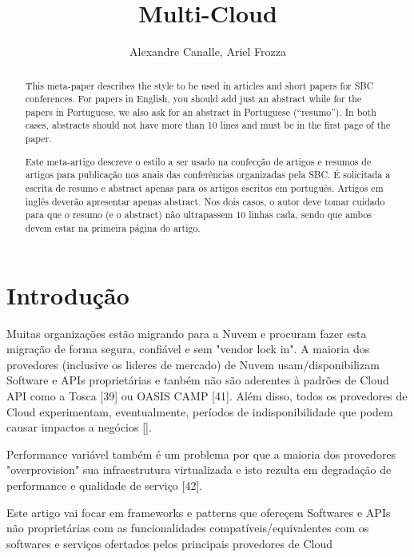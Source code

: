 \documentclass[12pt]{article}
\title{Multi-Cloud}
\author{Alexandre Canalle\inst{1}, Ariel Frozza\inst{1}}
\begin{document}

\singlespacing

\maketitle
	
\begin{abstract}
	This meta-paper describes the style to be used in articles and short papers
	for SBC conferences. For papers in English, you should add just an abstract
	while for the papers in Portuguese, we also ask for an abstract in
	Portuguese (``resumo''). In both cases, abstracts should not have more than
	10 lines and must be in the first page of the paper.
\end{abstract}

\begin{abstract} 
	Este meta-artigo descreve o estilo a ser usado na confecção de artigos e
	resumos de artigos para publicação nos anais das conferências organizadas
	pela SBC. É solicitada a escrita de resumo e abstract apenas para os artigos
	escritos em português. Artigos em inglês deverão apresentar apenas abstract.
	Nos dois casos, o autor deve tomar cuidado para que o resumo (e o abstract)
	não ultrapassem 10 linhas cada, sendo que ambos devem estar na primeira
	página do artigo.
\end{abstract}

	\section{Introdução}
		Muitas organizações estão migrando para a Nuvem e procuram fazer esta migração de forma segura, confiável e sem "vendor lock in". A maioria dos provedores (inclusive os lideres de mercado) de Nuvem usam/disponibilizam Software e APIs proprietárias e tanbém não são aderentes à padrões de Cloud API como a Tosca [39] ou OASIS CAMP [41]. Além disso, todos os provedores de Cloud experimentam, eventualmente, períodos de indisponibilidade que podem causar impactos a negócios [].
		
		Performance variável também é um problema por que a maioria dos provedores "overprovision" sua infraestrutura virtualizada e isto rezulta em degradação de performance e qualidade de serviço [42].
		
		Este artigo vai focar em frameworks e patterns que ofereçem Softwares e APIs não proprietárias com as funcionalidades compatíveis/equivalentes com os softwares e serviços ofertados pelos principais provedores de Cloud
		
\end{document}
